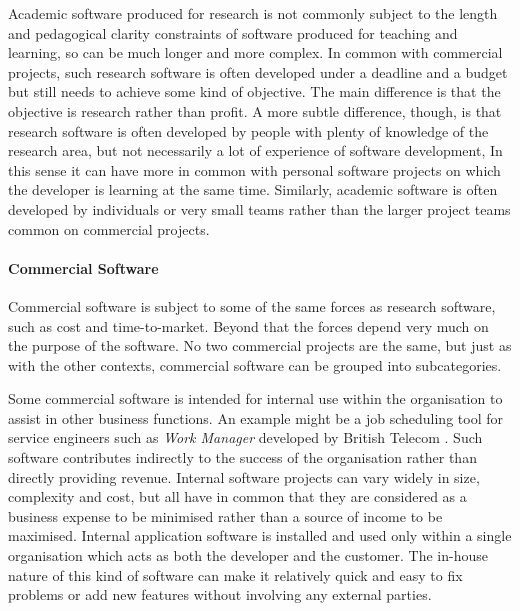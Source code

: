 Academic software produced for research is not commonly subject to the length and pedagogical clarity constraints of software produced for teaching and learning, so can be much longer and more complex. In common with commercial projects, such research software is often developed under a deadline and a budget but still needs to achieve some kind of objective. The main difference is that the objective is research rather than profit. A more subtle difference, though, is that research software is often developed by people with plenty of knowledge of the research area, but not necessarily a lot of experience of software development, In this sense it can have more in common with personal software projects on which the developer is learning at the same time. Similarly, academic software is often developed by individuals or very small teams rather than the larger project teams common on commercial projects.

\paragraph{Commercial Software}

Commercial software is subject to some of the same forces as research software, such as cost and time-to-market. Beyond that the forces depend very much on the purpose of the software. No two commercial projects are the same, but just as with the other contexts, commercial software can be grouped into subcategories.

Some commercial software is intended for internal use within the organisation to assist in other business functions. An example might be a job scheduling tool for service engineers such as \emph{Work Manager} developed by British Telecom \citep{Garwood1997}. Such software contributes indirectly to the success of the organisation rather than directly providing revenue. Internal software projects can vary widely in size, complexity and cost, but all have in common that they are considered as a business expense to be minimised rather than a source of income to be maximised. Internal application software is installed and used only within a single organisation which acts as both the developer and the customer. The in-house nature of this kind of software can make it relatively quick and easy to fix problems or add new features without involving any external parties.

